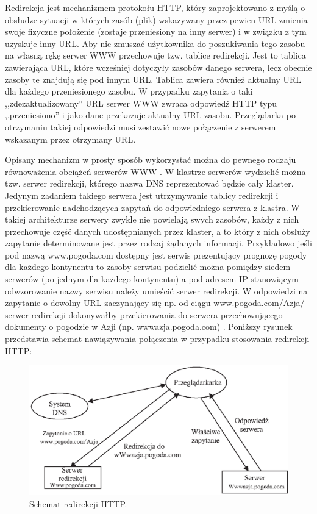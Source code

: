 Redirekcja jest  mechanizmem protokołu HTTP, który zaprojektowano z myślą o obsłudze sytuacji w których 
zasób (plik) wskazywany przez pewien URL zmienia swoje fizyczne położenie (zostaje przeniesiony na inny serwer) 
i w związku z tym uzyskuje inny URL. Aby nie zmuszać użytkownika do poszukiwania tego zasobu na własną rękę 
serwer WWW przechowuje tzw. tablice redirekcji. Jest to tablica zawierająca URL, które wcześniej dotyczyły 
zasobów danego serwera, lecz obecnie zasoby te znajdują się pod innym URL. Tablica zawiera również aktualny URL 
dla każdego przeniesionego zasobu. W przypadku zapytania o taki ,,zdezaktualizowany'' URL serwer WWW zwraca 
odpowiedź HTTP typu ,,przeniesiono'' i jako dane przekazuje aktualny URL zasobu. Przeglądarka po otrzymaniu takiej 
odpowiedzi musi zestawić nowe połączenie z serwerem wskazanym przez otrzymany URL.

Opisany mechanizm w prosty sposób wykorzystać można do pewnego rodzaju równoważenia obciążeń serwerów 
WWW \cite{barylo22,barylo23}. W klastrze serwerów wydzielić można tzw. serwer redirekcji, którego nazwa DNS reprezentować 
będzie cały klaster. Jedynym zadaniem takiego serwera jest utrzymywanie tablicy redirekcji i przekierowanie 
nadchodzących zapytań do odpowiedniego serwera z klastra. W takiej architekturze serwery zwykle nie powielają 
swych zasobów, każdy z nich przechowuje część danych udostępnianych przez klaster, a to który z nich obsłuży 
zapytanie determinowane jest przez rodzaj żądanych informacji. Przykładowo jeśli pod nazwą www.pogoda.com 
dostępny jest serwis prezentujący prognozę pogody dla każdego kontynentu to zasoby serwisu podzielić można 
pomiędzy siedem serwerów (po jednym dla każdego kontynentu) a pod adresem IP stanowiącym odwzorowanie nazwy 
serwisu należy umieścić serwer redirekcji. W odpowiedzi na zapytanie o dowolny URL zaczynający się np. od ciągu 
www.pogoda.com/Azja/ serwer redirekcji dokonywałby przekierowania do serwera przechowującego dokumenty o 
pogodzie w Azji (np. wwwazja.pogoda.com) \cite{barylo22}. Poniższy rysunek przedstawia schemat nawiązywania 
połączenia w przypadku stosowania redirekcji HTTP:
\begin{figure}[h]
\centering
\includegraphics[width=4.9in]{./rysunki/redirekcja.eps}
\caption{Schemat redirekcji HTTP.}
\label{redirekcja}
\end{figure}

